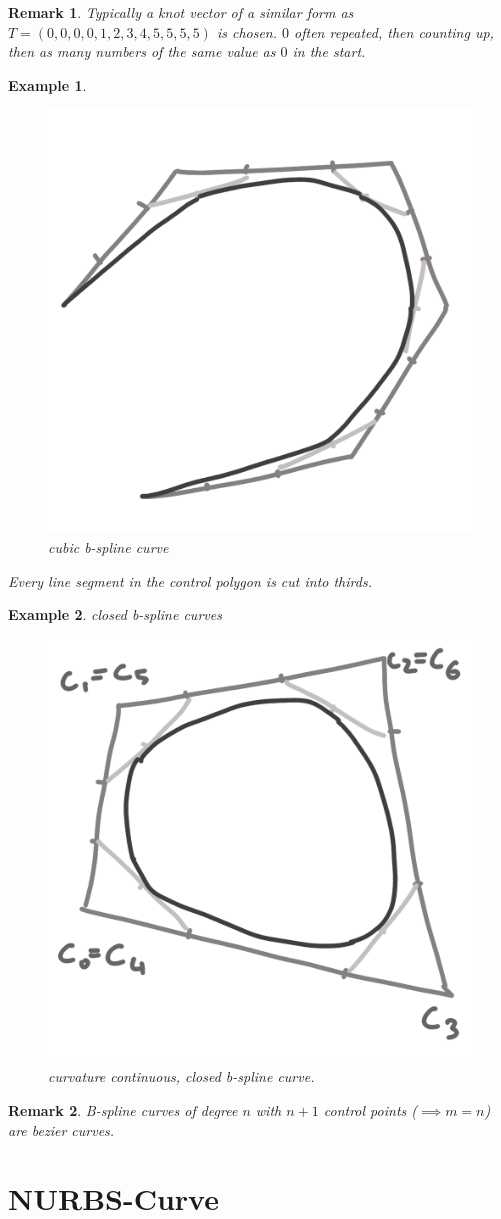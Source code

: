 \documentclass[]{article}
\newtheorem{example}{Example}
\newtheorem{remark}{Remark}
\begin{document}
\begin{remark}
	Typically a knot vector of a similar form as $T = (0, 0, 0, 0, 1, 2, 3, 4, 5, 5, 5, 5)$ is chosen. $0$ often repeated, then counting up, then as many numbers of the same value as $0$ in the start.
\end{remark}

\begin{example}
	\begin{figure}[h!]
		\centering
		\includegraphics[width=0.3\linewidth]{figures/cubic_b_spline}
		\caption{cubic b-spline curve}
		\label{fig:cubic_b_spline}
	\end{figure} 
	
	Every line segment in the control polygon is cut into thirds.
\end{example}

\begin{example}
	closed b-spline curves
	\begin{figure}[h!]
		\centering
		\includegraphics[width=0.3\linewidth]{figures/closed_b_spline}
		\caption{curvature continuous, closed b-spline curve.}
		\label{fig:closed_b_spline}
	\end{figure} 
\end{example}

\begin{remark}
	B-spline curves of degree $n$ with $n+1$ control points ($\implies m=n$) are bezier curves.
\end{remark}

\section{NURBS-Curve}
\end{document}
